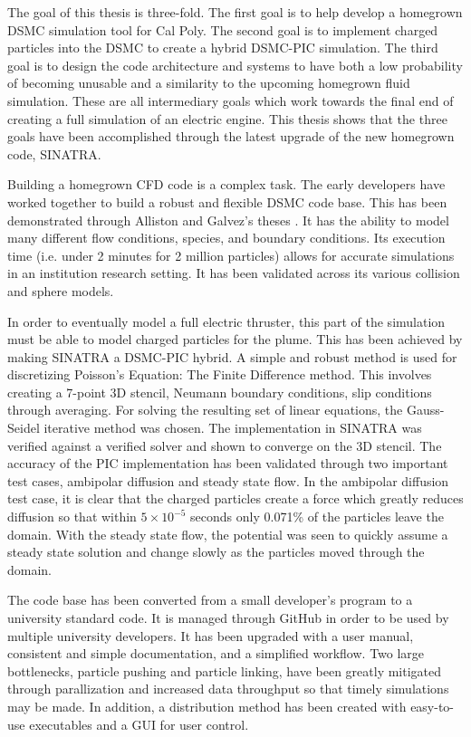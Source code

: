 
The goal of this thesis is three-fold. The first goal is to help develop a homegrown DSMC simulation tool for Cal Poly. The second goal is to implement charged particles into the DSMC to create a hybrid DSMC-PIC simulation. The third goal is to design the code architecture and systems to have both a low probability of becoming unusable and a similarity to the upcoming homegrown fluid simulation. These are all intermediary goals which work towards the final end of creating a full simulation of an electric engine. This thesis shows that the three goals have been accomplished through the latest upgrade of the new homegrown code, SINATRA. \par

\indent Building a homegrown CFD code is a complex task. The early developers have worked together to build a robust and flexible DSMC code base. This has been demonstrated through Alliston and Galvez's theses \cite{Galvez2018a,mac_thesis}. It has the ability to model many different flow conditions, species, and boundary conditions. Its execution time (i.e. under 2 minutes for 2 million particles) allows for accurate simulations in an institution research setting. It has been validated across its various collision and sphere models. \par


\indent In order to eventually model a full electric thruster, this part of the simulation must be able to model charged particles for the plume. This has been achieved by making SINATRA a DSMC-PIC hybrid. A simple and robust method is used for discretizing Poisson's Equation: The Finite Difference method. This involves creating a 7-point 3D stencil, Neumann boundary conditions, slip conditions through averaging. For solving the resulting set of linear equations, the Gauss-Seidel iterative method was chosen. The implementation in SINATRA was verified against a verified solver and shown to converge on the 3D stencil. The accuracy of the PIC implementation has been validated through two important test cases, ambipolar diffusion and steady state flow. In the ambipolar diffusion test case, it is clear that the charged particles create a force which greatly reduces diffusion so that within \(5\times 10^{-5}\) seconds only 0.071\% of the particles leave the domain. With the steady state flow, the potential was seen to quickly assume a steady state solution and change slowly as the particles moved through the domain. \par

\indent The code base has been converted from a small developer's program to a university standard code. It is managed through GitHub\textsuperscript{\textregistered} in order to be used by multiple university developers. It has been upgraded with a user manual, consistent and simple documentation, and a simplified workflow. Two large bottlenecks, particle pushing and particle linking, have been greatly mitigated through parallization and increased data throughput so that timely simulations may be made. In addition, a distribution method has been created with easy-to-use executables and a GUI for user control. \par

